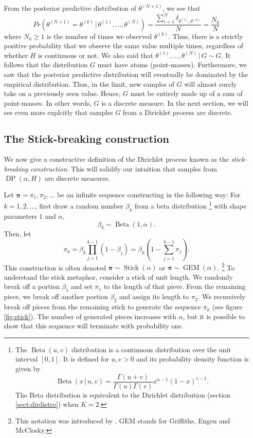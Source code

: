 \documentclass[final,3p,times,twocolumn]{elsarticle}
\DeclareMathOperator*{\DP}{DP}
\DeclareMathOperator*{\Beta}{Beta}
\DeclareMathOperator*{\GEM}{GEM}
\DeclareMathOperator*{\Stick}{Stick}
\let\bs\boldsymbol
\begin{document}
From the posterior predictive distribution of $\theta^{(N+1)}$, we see that
\begin{equation}
\label{eqn:dpprobsame}
Pr(\theta^{(N+1)} = \theta^{(k)} \,|\,\theta^{(1)},\dots,\theta^{(N)}) = \frac{\sum_{i=1}^N \delta_{\theta^{(i)},\theta^{(k)}}}{N} = \frac{N_k}{N}
\end{equation}
where $N_k \geq 1$ is the number of times we observed $\theta^{(k)}$.
Thus, there is a strictly positive probability that we observe the same value multiple times, regardless of whether $H$ is continuous or not.
We also said that $\theta^{(1)},\dots,\theta^{(N)} \,|\,G \sim G$.
It follows that the distribution $G$ must have atoms (point-masses).
Furthermore, we saw that the posterior predictive distribution will eventually be dominated by the empirical distribution.
Thus, in the limit, new samples of $G$ will almost surely take on a previously seen value. 
Hence, $G$ must be entirely made up of a sum of point-masses. 
In other words, $G$ is a discrete measure.
In the next section, we will see even more explcitly that samples $G$ from a Dirichlet process are discrete.

\subsection{The Stick-breaking construction}
We now give a constructive definition of the Dirichlet process known as the \emph{stick-breaking construction}.
This will solidify our intuition that samples from $\DP(\alpha,H)$ are discrete measures.

Let $\bs \pi = {\pi_1,\pi_2,\dots}$ be an infinite sequence constructing in the following way:
For $k=1,2,\dots$, first draw a random number $\beta_k$ from a beta distribution
\footnote{The $\Beta(u,v)$ distribution is a continuous distribution over the unit interval $[0,1]$. It is defined for $u,v > 0$ and its probability density function is given by
\[
\Beta(x\,|\,u,v) = \frac{\Gamma(u+v)}{\Gamma(u)\Gamma(v)}x^{u-1}(1-x)^{v-1}.
\]
The Beta distribution is equivalent to the Dirichlet distribution (section \ref{sect:dirdistro}) when $K=2$.}
with shape parameters $1$ and $\alpha$,
\begin{equation}
\beta_k \sim \Beta(1,\alpha).
\end{equation}
Then, let
\begin{equation}
\pi_k = \beta_k \prod_{j=1}^{k-1} (1-\beta_j) = \beta_k (1 - \sum_{j=1}^{k-1} \pi_j).
\end{equation}
This construction is often denoted $\bs \pi \sim \Stick(\alpha)$ or $\bs \pi \sim \GEM(\alpha)$.
\footnote{
This notation was introduced by \cite{ewens1990}.
GEM stands for Griffiths, Engen and McClosky.}
To understand the stick metaphor, consider a stick of unit length. 
We randomly break off a portion $\beta_1$ and set $\pi_1$ to the length of that pieve. 
From the remaining piece, we break off another portion $\beta_2$ and assign its length to $\pi_2$.
We recursively break off pieces from the remaining stick to generate the sequence $\pi_k$ (see figure \ref{fig:stick}).
The number of generated pieces increases with $\alpha$, but it is possible to show that this sequence will terminate with probability one.
\end{document}
